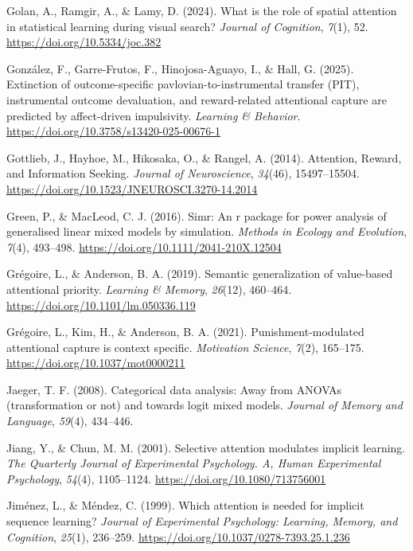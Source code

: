 \documentclass[
  man,
  floatsintext,
  longtable,
  nolmodern,
  notxfonts,
  notimes,
  mask,
  colorlinks=true,linkcolor=blue,citecolor=blue,urlcolor=blue]{apa7}
\newlength{\cslhangindent}
\newenvironment{CSLReferences}[2] %
 {\begin{list}{}{%
  \setlength{\itemindent}{0pt}
  \setlength{\leftmargin}{0pt}
  \setlength{\parsep}{0pt}
  \ifodd #1
   \setlength{\leftmargin}{\cslhangindent}
   \setlength{\itemindent}{-1\cslhangindent}
  \fi
  \setlength{\itemsep}{#2\baselineskip}}}
 {\end{list}}
\begin{document}
\begin{CSLReferences}{1}{0}
Golan, A., Ramgir, A., \& Lamy, D. (2024). What is the role of spatial
attention in statistical learning during visual search? \emph{Journal of
Cognition}, \emph{7}(1), 52. \url{https://doi.org/10.5334/joc.382}

González, F., Garre-Frutos, F., Hinojosa-Aguayo, I., \& Hall, G. (2025).
Extinction of outcome-specific pavlovian-to-instrumental transfer (PIT),
instrumental outcome devaluation, and reward-related attentional capture
are predicted by affect-driven impulsivity. \emph{Learning \& Behavior}.
\url{https://doi.org/10.3758/s13420-025-00676-1}

Gottlieb, J., Hayhoe, M., Hikosaka, O., \& Rangel, A. (2014). Attention,
Reward, and Information Seeking. \emph{Journal of Neuroscience},
\emph{34}(46), 15497--15504.
\url{https://doi.org/10.1523/JNEUROSCI.3270-14.2014}

Green, P., \& MacLeod, C. J. (2016). Simr: An r package for power
analysis of generalised linear mixed models by simulation. \emph{Methods
in Ecology and Evolution}, \emph{7}(4), 493--498.
\url{https://doi.org/10.1111/2041-210X.12504}

Grégoire, L., \& Anderson, B. A. (2019). Semantic generalization of
value-based attentional priority. \emph{Learning \& Memory},
\emph{26}(12), 460--464. \url{https://doi.org/10.1101/lm.050336.119}

Grégoire, L., Kim, H., \& Anderson, B. A. (2021). Punishment-modulated
attentional capture is context specific. \emph{Motivation Science},
\emph{7}(2), 165--175. \url{https://doi.org/10.1037/mot0000211}

Jaeger, T. F. (2008). Categorical data analysis: Away from ANOVAs
(transformation or not) and towards logit mixed models. \emph{Journal of
Memory and Language}, \emph{59}(4), 434--446.

Jiang, Y., \& Chun, M. M. (2001). Selective attention modulates implicit
learning. \emph{The Quarterly Journal of Experimental Psychology. A,
Human Experimental Psychology}, \emph{54}(4), 1105--1124.
\url{https://doi.org/10.1080/713756001}

Jiménez, L., \& Méndez, C. (1999). Which attention is needed for
implicit sequence learning? \emph{Journal of Experimental Psychology:
Learning, Memory, and Cognition}, \emph{25}(1), 236--259.
\url{https://doi.org/10.1037/0278-7393.25.1.236}


\end{CSLReferences}
\end{document}
